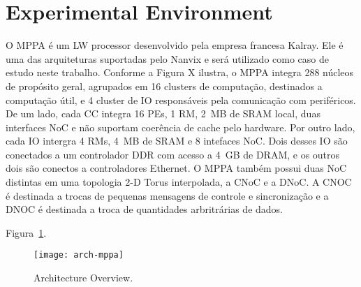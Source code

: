\section{Experimental Environment}
\label{sec:platform}

	O MPPA é um LW processor desenvolvido pela empresa francesa Kalray. Ele
	é uma das arquiteturas suportadas pelo Nanvix e será utilizado como caso de
	estudo neste trabalho. Conforme a Figura X ilustra, o MPPA integra 288
	núcleos de propósito geral, agrupados em 16 clusters de computação, destinados
	a computação útil, e 4 cluster de IO responsáveis pela comunicação com
	periféricos.  De um lado, cada CC integra 16 PEs, 1 RM, 2~MB de SRAM local,
	duas interfaces NoC e não suportam coerência de cache pelo hardware.  Por outro
	lado, cada IO intergra 4 RMs, 4~MB de SRAM e 8 intefaces NoC. Dois desses IO
	são conectados a um controlador DDR com acesso a 4~GB de DRAM, e os outros dois
	são conectos a controladores Ethernet.  O MPPA também possui duas NoC distintas
	em uma topologia 2-D Torus interpolada, a CNoC e a DNoC. A CNOC é destinada
	a trocas de pequenas mensagens de controle e sincronização e a DNOC é destinada
	a troca de quantidades arbritrárias de dados.

	Figura~\ref{fig:mppa}.
	\begin{figure}[b]
			\centering
			\texttt{[image: arch-mppa]}
			\caption{\mppa Architecture Overview.}
			\label{fig:mppa}
	\end{figure}


